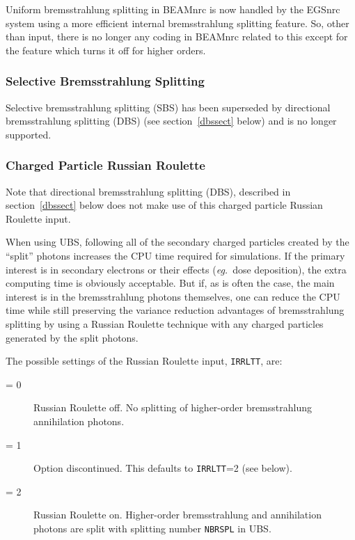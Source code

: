 \documentclass[12pt,twoside]{article}
\newcommand{\eg}{{\em eg.}}
\begin{document}
Uniform bremsstrahlung splitting in BEAMnrc is now handled by the EGSnrc
system using a more efficient internal bremsstrahlung splitting feature.
So, other than input, there is no longer any coding in BEAMnrc related
to this except for the feature which turns it off for higher orders.

\subsubsection{Selective Bremsstrahlung Splitting}
\label{sbssect}

Selective bremsstrahlung splitting (SBS) has been superseded by
directional bremsstrahlung splitting (DBS) (see section~\ref{dbssect} below) and is no longer
supported.

\subsubsection{Charged Particle Russian Roulette}
\label{rusrousect}

Note that directional bremsstrahlung splitting (DBS), described in
section~\ref{dbssect} below does not make use of this
charged particle Russian Roulette input.

When using UBS, following all of the secondary charged particles
created by the
``split'' photons increases
the CPU time required for simulations.
If the primary interest is in
secondary electrons or their effects (\eg\ dose deposition), the extra
computing time is obviously acceptable.  But if, as is often the case, the
main interest is in the bremsstrahlung photons themselves, one can reduce
the CPU time while still preserving the variance reduction advantages of
bremsstrahlung splitting by using a Russian Roulette technique with any
charged particles generated by the split photons.

The possible settings of the Russian Roulette input, {\tt IRRLTT}, are:

\begin{description}
\item[= 0] Russian Roulette off.  No splitting of higher-order
           bremsstrahlung annihilation photons.
\item[= 1] Option discontinued.  This defaults to {\tt IRRLTT}=2 (see below).
\item[= 2] Russian Roulette on.  Higher-order
           bremsstrahlung and annihilation photons are split
           with splitting number {\tt NBRSPL} in UBS.
\end{description}
\end{document}
